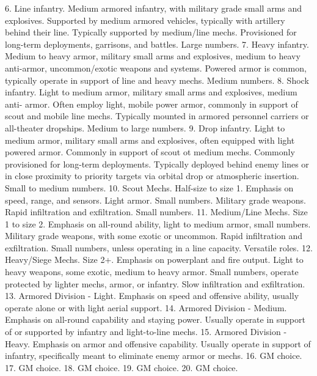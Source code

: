     6.  Line infantry. Medium armored infantry, with military grade small arms and explosives.
        Supported by medium armored vehicles, typically with artillery behind their line. Typically
        supported by medium/line mechs. Provisioned for long-term deployments, garrisons, and
        battles. Large numbers.
    7.  Heavy infantry. Medium to heavy armor, military small arms and explosives, medium to
        heavy anti-armor, uncommon/exotic weapons and systems. Powered armor is common,
        typically operate in support of line and heavy mechs. Medium numbers.
    8.  Shock infantry. Light to medium armor, military small arms and explosives, medium anti-
        armor. Often employ light, mobile power armor, commonly in support of scout and mobile
        line mechs. Typically mounted in armored personnel carriers or all-theater dropships.
        Medium to large numbers.
    9.  Drop infantry. Light to medium armor, military small arms and explosives, often equipped
        with light powered armor. Commonly in support of scout ot medium mechs. Commonly
        provisioned for long-term deployments. Typically deployed behind enemy lines or in close
        proximity to priority targets via orbital drop or atmospheric insertion. Small to medium
        numbers.
    10. Scout Mechs. Half-size to size 1. Emphasis on speed, range, and sensors. Light armor.
        Small numbers. Military grade weapons. Rapid infiltration and exfiltration. Small numbers.
    11. Medium/Line Mechs. Size 1 to size 2. Emphasis on all-round ability, light to medium armor,
        small numbers. Military grade weapons, with some exotic or uncommon. Rapid infiltration
        and exfiltration. Small numbers, unless operating in a line capacity. Versatile roles.
    12. Heavy/Siege Mechs. Size 2+. Emphasis on powerplant and fire output. Light to heavy
        weapons, some exotic, medium to heavy armor. Small numbers, operate protected by
        lighter mechs, armor, or infantry. Slow infiltration and exfiltration.
    13. Armored Division - Light. Emphasis on speed and offensive ability, usually operate alone
        or with light aerial support.
    14. Armored Division - Medium. Emphasis on all-round capability and staying power. Usually
        operate in support of or supported by infantry and light-to-line mechs.
    15. Armored Division - Heavy. Emphasis on armor and offensive capability. Usually operate in
        support of infantry, specifically meant to eliminate enemy armor or mechs.
    16. GM choice.
    17. GM choice.
    18. GM choice.
    19. GM choice.
    20. GM choice.

